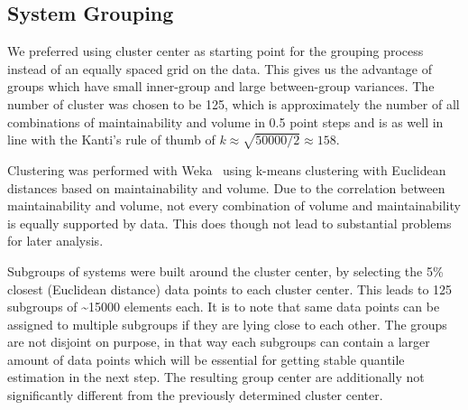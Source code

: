\subsection{System Grouping}
We preferred using cluster center as starting point for the grouping process instead of an equally spaced grid on the data. This gives us the advantage of groups which have small inner-group and large between-group variances.
The number of cluster was chosen to be 125, which is approximately the number of all combinations of maintainability and volume in 0.5 point steps and is as well in line with the Kanti's rule of thumb \cite{kanti1979multivariate} of \(k\approx\sqrt{50000/2}\approx158\). 

Clustering was performed with Weka~\cite{hall2009weka} using k-means clustering with Euclidean distances based on maintainability and volume.
Due to the correlation between maintainability and volume, not every combination of volume and maintainability is equally supported by data. This does though not lead to substantial problems for later analysis.

Subgroups of systems were built around the cluster center, by selecting the 5\% closest (Euclidean distance) data points to each cluster center. This leads to 125 subgroups of \textasciitilde15000 elements each. It is to note that same data points can be assigned to multiple subgroups if they are lying close to each other. The groups are not disjoint on purpose, in that way each subgroups can contain a larger amount of data points which will be essential for getting stable quantile estimation in the next step. The resulting group center are additionally not significantly different from the previously determined cluster center.

